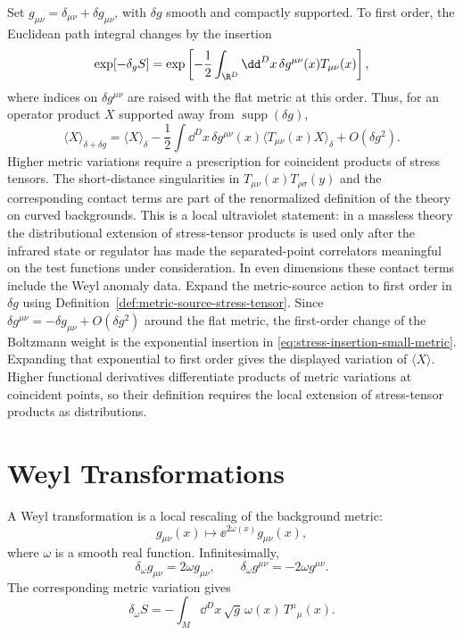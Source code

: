 Set \(g_{\mu\nu}=\delta_{\mu\nu}+\delta g_{\mu\nu}\), with \(\delta g\) smooth
and compactly supported.  To first order, the Euclidean path integral changes
by the insertion
\begin{equation}
  \exp[-\delta_g S]
  =
  \exp\left[
  -\frac12\int_{\R^D}\dd^Dx\,
  \delta g^{\mu\nu}(x)T_{\mu\nu}(x)
  \right],
  \label{eq:stress-insertion-small-metric}
\end{equation}
where indices on \(\delta g^{\mu\nu}\) are raised with the flat metric at this
order.  Thus, for an operator product \(X\) supported away from
\(\operatorname{supp}(\delta g)\),
\[
  \langle X\rangle_{\delta+\delta g}
  =
  \langle X\rangle_{\delta}
  -
  \frac12\int\dd^Dx\,\delta g^{\mu\nu}(x)
  \langle T_{\mu\nu}(x)X\rangle_{\delta}
  +
  O(\delta g^2).
\]
Higher metric variations require a prescription for coincident products of
stress tensors.  The short-distance singularities in
\(T_{\mu\nu}(x)T_{\rho\sigma}(y)\) and the corresponding contact terms are part
of the renormalized definition of the theory on curved backgrounds.  This is a
local ultraviolet statement: in a massless theory the distributional extension
of stress-tensor products is used only after the infrared state or regulator
has made the separated-point correlators meaningful on the test functions
under consideration.  In even dimensions these contact terms include the Weyl
anomaly data.
Expand the metric-source action to first order in \(\delta g\) using
Definition~\ref{def:metric-source-stress-tensor}.  Since
\(\delta g^{\mu\nu}=-\delta g_{\mu\nu}+O(\delta g^2)\) around the flat metric,
the first-order change of the Boltzmann weight is the exponential insertion in
\eqref{eq:stress-insertion-small-metric}.  Expanding that exponential to first
order gives the displayed variation of \(\langle X\rangle\).  Higher
functional derivatives differentiate products of metric variations at
coincident points, so their definition requires the local extension of
stress-tensor products as distributions.

\section{Weyl Transformations}

\begin{definition}
\label{def:weyl-transformation-trace-insertion}
A Weyl transformation is a local rescaling of the background metric:
\[
  g_{\mu\nu}(x)\mapsto \ee^{2\omega(x)}g_{\mu\nu}(x),
\]
where \(\omega\) is a smooth real function.  Infinitesimally,
\[
  \delta_\omega g_{\mu\nu}=2\omega g_{\mu\nu},
  \qquad
  \delta_\omega g^{\mu\nu}=-2\omega g^{\mu\nu}.
\]
The corresponding metric variation gives
\[
  \delta_\omega S
  =
  -
  \int_M\dd^D x\,\sqrt g\,
  \omega(x)\,T^\mu{}_\mu(x).
\]
\end{definition}
